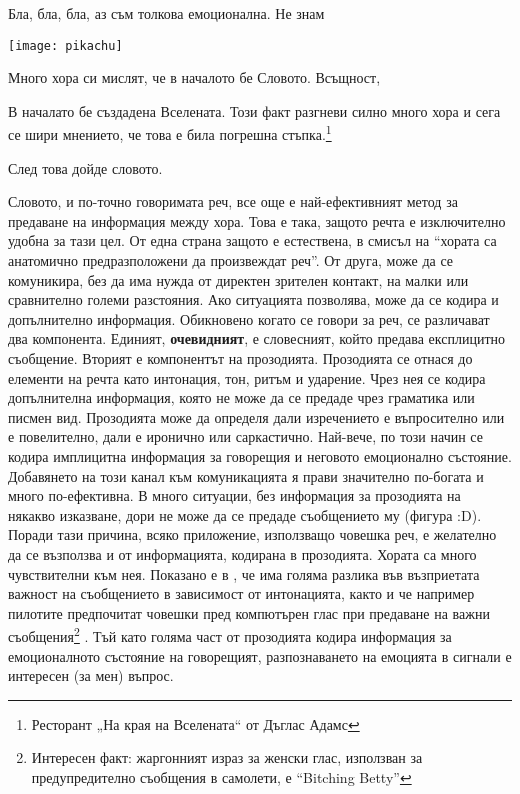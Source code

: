 \documentclass[main.tex]{subfiles}
\begin{document}
Бла, бла, бла, аз съм толкова емоционална. 
Не знам

\texttt{[image: pikachu]}

Много хора си мислят, че в началото бе Словото. Всъщност, 
\begin{displayquote}
    В началато бе създадена Вселената. Този факт разгневи силно много хора и сега се шири мнението, че това е била погрешна стъпка.\footnote{Ресторант „На края на Вселената“ от Дъглас Адамс}
\end{displayquote}
    
След това дойде словото.

Словото, и по-точно говоримата реч, все още е най-ефективният метод за предаване на информация между хора. Това е така, защото речта е изключително удобна за тази цел. От една страна защото е естествена, в смисъл на ``хората са анатомично предразположени да произвеждат реч''. От друга, може да се комуникира, без да има нужда от директен зрителен контакт, на малки или сравнително големи разстояния. Ако ситуацията позволява, може да се кодира и допълнително информация. Обикновено когато се говори за реч, се различават два компонента. Единият, \textbf{очевидният}, е словесният, който предава експлицитно съобщение. Вторият е компонентът на прозодията. Прозодията се отнася до елементи на речта като интонация, тон, ритъм и ударение. Чрез нея се кодира допълнителна информация, която не може да се предаде чрез граматика или писмен вид. Прозодията може да определя дали изречението е въпросително или е повелително, дали е иронично или саркастично. Най-вече, по този начин се кодира имплицитна информация за говорещия и неговото емоционално състояние. Добавянето на този канал към комуникацията я прави значително по-богата и много по-ефективна. В много ситуации, без информация за прозодията на някакво изказване, дори не може да се предаде съобщението му (фигура :D). Поради тази причина, всяко приложение, използващо човешка реч, е желателно да се възползва и от информацията, кодирана в прозодията. Хората са много чувствителни към нея. Показано е в \cite{urgency}, че има голяма разлика във възприетата важност на съобщението в зависимост от интонацията, както и че например пилотите предпочитат човешки пред компютърен глас при предаване на важни съобщения\footnote{Интересен факт: жаргонният израз за женски глас, използван за предупредително съобщения в самолети, е ``Bitching Betty''} \cite{cockpit}. Тъй като голяма част от прозодията кодира информация за емоционалното състояние на говорещият, разпознаването на емоцията в сигнали е интересен (за мен) въпрос.
\end{document}
